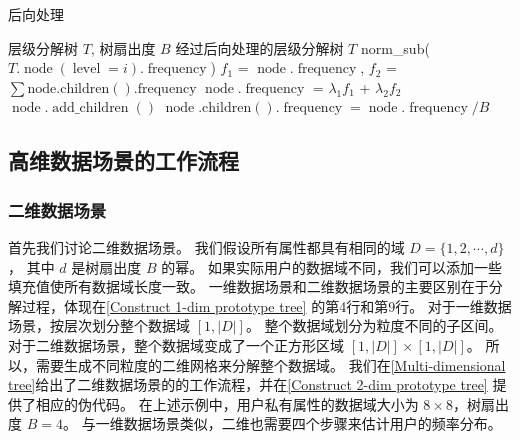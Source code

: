 \begin{algorithm}[!ht]
	\caption{后向处理}
	\label{alg:1-dim post_processing}
	\begin{algorithmic}[1]
        \REQUIRE \myahead 层级分解树 $T$, 树扇出度 $B$
        \ENSURE 经过后向处理的\myahead 层级分解树 $T$
		\STATE norm\_sub($T.\operatorname{node}(\operatorname{level}=i).\operatorname{frequency}$)
        \ENDFOR    
            \STATE $f_1$ = $\operatorname{node}.\operatorname{frequency}$, $f_2$ = $\sum{\operatorname{node.children().frequency}}$
		    \STATE $\operatorname{node}.\operatorname{frequency}$ = $\lambda_1$$f_1$ + $\lambda_2$$f_2$
            \ENDFOR 
        \ENDFOR    
		            \STATE $\operatorname{node}.\operatorname{add\_children}()$
		            \STATE $\operatorname{node}.\operatorname{children()}.\operatorname{frequency} = \operatorname{node}.\operatorname{frequency}/B$
                    \ENDIF
            \ENDFOR 
        \ENDFOR    
    \end{algorithmic}
\end{algorithm}

\subsection{高维数据场景\myahead 的工作流程}
\label{Extension to Multi-dimensional Settings}
\subsubsection{二维数据场景}

首先我们讨论二维数据场景。
我们假设所有属性都具有相同的域 $D = \{1, 2, \cdots, d\}$，
其中 $d$ 是树扇出度 $B$ 的幂。
如果实际用户的数据域不同，我们可以添加一些填充值使所有数据域长度一致。
一维数据场景和二维数据场景的主要区别在于分解过程，体现在\autoref{Construct 1-dim prototype tree} 的第4行和第9行。
对于一维数据场景，\myahead 按层次划分整个数据域 $[1, |D|]$。
整个数据域划分为粒度不同的子区间。
对于二维数据场景，整个数据域变成了一个正方形区域 $[1, |D|] \times [1, |D|]$。
所以，\myahead 需要生成不同粒度的二维网格来分解整个数据域。
我们在\autoref{Multi-dimensional tree}给出了二维数据场景的\myahead 的工作流程，并在\autoref{Construct 2-dim prototype tree} 提供了相应的伪代码。
在上述示例中，用户私有属性的数据域大小为 $8\times8$，树扇出度 $B=4$。
与一维数据场景类似，二维\myahead 也需要四个步骤来估计用户的频率分布。

